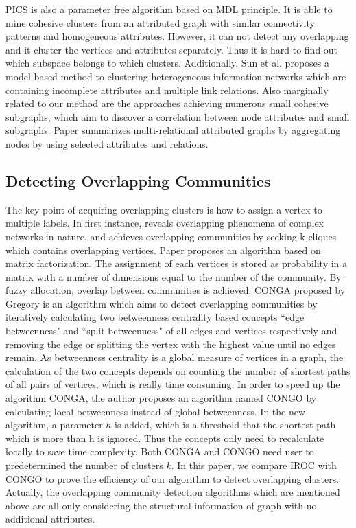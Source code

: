 PICS\cite{DBLP:conf/sdm/AkogluTMF12} is also a parameter free algorithm based on MDL principle. It is able to mine cohesive clusters from an attributed graph with similar connectivity patterns and homogeneous attributes. However, it can not detect any overlapping and it cluster the vertices and attributes separately. Thus it is hard to find out which subspace belongs to which clusters. Additionally, Sun et al. \cite{DBLP:journals/pvldb/SunAH12} proposes a model-based method to clustering heterogeneous information networks which are containing incomplete attributes and multiple link relations. Also marginally related to our method are the approaches \cite{DBLP:journals/pvldb/SilvaMZ12}\cite{DBLP:conf/sdm/MoserCRE09}\cite{DBLP:conf/kdd/TongFGE07} achieving numerous small cohesive subgraphs, which aim to discover a correlation between node attributes and small subgraphs. Paper \cite{DBLP:conf/sigmod/TianHP08} summarizes multi-relational attributed graphs by aggregating nodes by using selected attributes and relations.

\subsection{Detecting Overlapping Communities}
The key point of acquiring overlapping clusters is how to assign a vertex to multiple labels. In first instance, \cite{nature} reveals overlapping phenomena of complex networks in nature, and achieves overlapping communities by seeking k-cliques which contains overlapping vertices. Paper \cite{DBLP:conf/kdd/ZhangY12} proposes an algorithm based on matrix factorization. The assignment of each vertices is stored as probability in a matrix with a number of dimensions equal to the number of the community. By fuzzy allocation, overlap between communities is achieved. CONGA\cite{DBLP:conf/pkdd/Gregory07} proposed by Gregory is an algorithm which aims to detect overlapping communities by iteratively calculating two betweenness centrality based concepts ``edge betweenness" and ``split betweenness" of all edges and vertices respectively and removing the edge or splitting the vertex with the highest value until no edges remain. As betweenness centrality is a global measure of vertices in a graph, the calculation of the two concepts depends on counting the number of shortest paths of all pairs of vertices, which is really time consuming. In order to speed up the algorithm CONGA, the author proposes an algorithm named CONGO\cite{DBLP:conf/pkdd/Gregory08} by calculating local betweenness instead of global betweenness. In the new algorithm, a parameter $h$ is added, which is a threshold that the shortest path which is more than h is ignored. Thus the concepts only need to recalculate locally to save time complexity. Both CONGA and CONGO need user to predetermined the number of clusters $k$. In this paper, we compare IROC with CONGO to prove the efficiency of our algorithm to detect overlapping clusters. Actually, the overlapping community detection algorithms which are mentioned above are all only considering the structural information of graph with no additional attributes.



